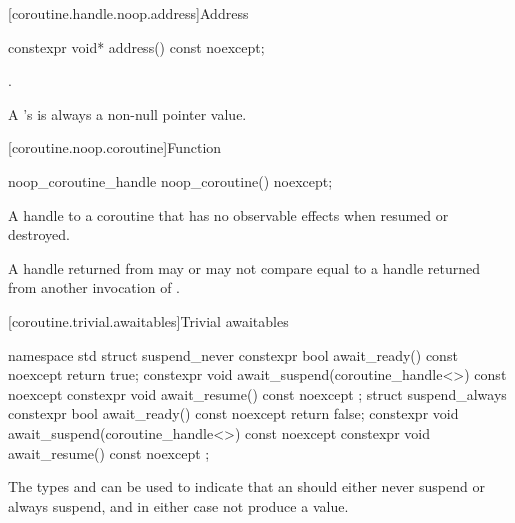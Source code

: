 [coroutine.handle.noop.address]{Address}

%
\begin{itemdecl}
constexpr void* address() const noexcept;
\end{itemdecl}

\begin{itemdescr}
\pnum \returns {}.

\pnum \remarks A 's  is always a
non-null pointer value.
\end{itemdescr}

[coroutine.noop.coroutine]{Function }

%
\begin{itemdecl}
noop_coroutine_handle noop_coroutine() noexcept;
\end{itemdecl}

\begin{itemdescr}
\pnum \returns A handle to a coroutine that has no observable effects
when resumed or destroyed.

\pnum \remarks A handle returned from  may or may not
compare equal to a handle returned from another invocation
of .
\end{itemdescr}

[coroutine.trivial.awaitables]{Trivial awaitables}

%
%
%
%
%
%
%
%
\begin{codeblock}
namespace std {
  struct suspend_never {
    constexpr bool await_ready() const noexcept { return true; }
    constexpr void await_suspend(coroutine_handle<>) const noexcept {}
    constexpr void await_resume() const noexcept {}
  };
  struct suspend_always {
    constexpr bool await_ready() const noexcept { return false; }
    constexpr void await_suspend(coroutine_handle<>) const noexcept {}
    constexpr void await_resume() const noexcept {}
  };
}
\end{codeblock}

\pnum
\begin{note}
The types  and  can be used
to indicate that an  should either never
suspend or always suspend, and in either case not produce a value.
\end{note}

